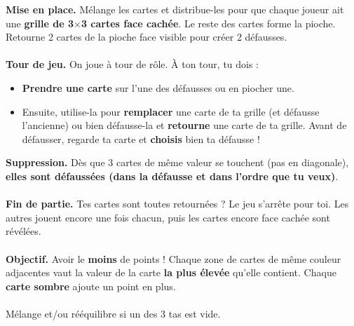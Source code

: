 \documentclass[a4paper]{memoir}
\begin{document}
{\footnotesize

\noindent
\textbf{ Mise en place.} Mélange les cartes et distribue-les pour que chaque joueur ait une \textbf{grille de 3$\times$3 cartes face cachée}. 
Le reste des cartes forme la pioche. Retourne 2 cartes de la pioche face visible pour créer 2 défausses.
\\
\\
\textbf{ Tour de jeu.} On joue à tour de rôle. À ton tour, tu dois :
\begin{itemize}
    \item \textbf{Prendre une carte} sur l'une des défausses ou en piocher une.
    \item Ensuite, utilise-la pour \textbf{remplacer} une carte de ta grille (et défausse l’ancienne) ou bien défausse-la et \textbf{retourne} une carte de ta grille.
    Avant de défausser, regarde ta carte et \textbf{choisis} bien ta défausse !
\end{itemize}
\textbf{ Suppression.} Dès que 3 cartes de même valeur se touchent (pas en diagonale), \textbf{elles sont défaussées (dans la défausse et dans l'ordre que tu veux)}.
\\
\\
\textbf{ Fin de partie.} Tes cartes sont toutes retournées ? Le jeu s'arrête pour toi. 
Les autres jouent encore une fois chacun, puis les cartes encore face cachée sont révélées.
\\
\\
\textbf{ Objectif.} Avoir le \textbf{moins} de points ! 
Chaque zone de cartes de {même couleur adjacentes} vaut la valeur de la carte \textbf{la plus élevée} qu'elle contient.
Chaque \textbf{carte sombre} ajoute un point en plus.
\\
\\
\noindent
{} Mélange et/ou rééquilibre si un des 3 tas est vide.
}
\end{document}
